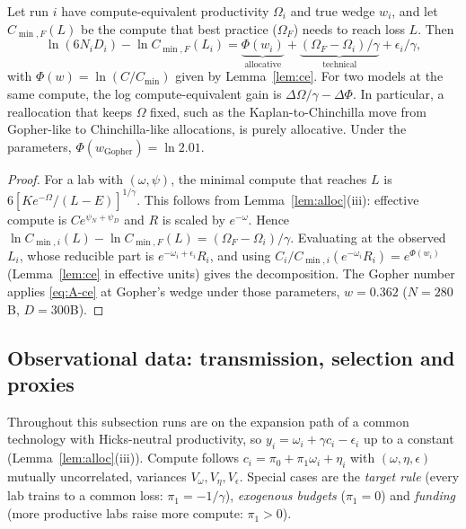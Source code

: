 \begin{proposition}\label{prop:farrell}
Let run $i$ have compute-equivalent productivity $\Omega_i$ and true wedge $w_i$, and let $C_{\min,F}(L)$ be the compute
that best practice ($\Omega_F$) needs to reach loss $L$. Then
\[
\ln(6N_iD_i)-\ln C_{\min,F}(L_i)=\underbrace{\Phi(w_i)}_{\text{allocative}}+\underbrace{(\Omega_F-\Omega_i)/\gamma}_{\text{technical}}+\epsilon_i/\gamma,
\]
with $\Phi(w)=\ln(C/C_{\min})$ given by Lemma~\ref{lem:ce}. For two models at the same compute, the log compute-equivalent
gain is $\Delta\Omega/\gamma-\Delta\Phi$. In particular, a reallocation that keeps $\Omega$ fixed, such as the
Kaplan-to-Chinchilla move from Gopher-like to Chinchilla-like allocations, is purely allocative. Under the
\citet{besiroglu2024chinchilla} parameters, $\Phi(w_{\text{Gopher}})=\ln 2.01$.
\end{proposition}

\begin{proof}
For a lab with $(\omega,\psi)$, the minimal compute that reaches $L$ is $6[Ke^{-\Omega}/(L-E)]^{1/\gamma}$. This follows
from Lemma~\ref{lem:alloc}(iii): effective compute is $Ce^{\psi_N+\psi_D}$ and $R$ is scaled by $e^{-\omega}$. Hence
$\ln C_{\min,i}(L)-\ln C_{\min,F}(L)=(\Omega_F-\Omega_i)/\gamma$. Evaluating at the observed $L_i$, whose reducible part is
$e^{-\omega_i+\epsilon_i}R_i$, and using $C_i/C_{\min,i}(e^{-\omega_i}R_i)=e^{\Phi(w_i)}$ (Lemma~\ref{lem:ce} in
effective units) gives the decomposition. The Gopher number applies \eqref{eq:A-ce} at Gopher's wedge under those
parameters, $w=0.362$ ($N=280$B, $D=300$B).
\end{proof}

\subsection{Observational data: transmission, selection and proxies}\label{app:observational}

Throughout this subsection runs are on the expansion path of a common technology with Hicks-neutral productivity, so
$y_i=\omega_i+\gamma c_i-\epsilon_i$ up to a constant (Lemma~\ref{lem:alloc}(iii)). Compute follows
$c_i=\pi_0+\pi_1\omega_i+\eta_i$ with $(\omega,\eta,\epsilon)$ mutually uncorrelated, variances $V_\omega,V_\eta,V_\epsilon$.
Special cases are the \emph{target rule} (every lab trains to a common loss: $\pi_1=-1/\gamma$), \emph{exogenous budgets}
($\pi_1=0$) and \emph{funding} (more productive labs raise more compute: $\pi_1>0$).

